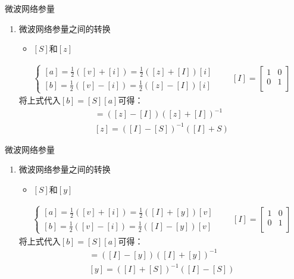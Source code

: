 \begin{frame}{微波网络参量}
    \begin{enumerate}
        \resume
        \item 微波网络参量之间的转换
        \begin{itemize}
            \item $[S]$和$[z]$
        \end{itemize}
        \begin{align*}
            \begin{cases}
                [a]=\frac{1}{2}([v]+[i])=\frac{1}{2}([z]+[I])[i]\\
                [b]=\frac{1}{2}([v]-[i])=\frac{1}{2}([z]-[I])[i]
            \end{cases}
            \qquad
            [I]=\begin{bmatrix*}
                1 & 0 \\
                0 & 1 \\
            \end{bmatrix*}
        \end{align*}
        将上式代入$[b]=[S][a]$可得：
        \begin{gather*}
            [S]=([z]-[I])([z]+[I])^{-1}\\
            [z]=([I]-[S])^{-1}([I]+{S})
        \end{gather*}
    \end{enumerate}
\end{frame}

\begin{frame}{微波网络参量}
    \begin{enumerate}
        \resume
        \item 微波网络参量之间的转换
        \begin{itemize}
            \item $[S]$和$[y]$
        \end{itemize}
        \begin{align*}
            \begin{cases}
                [a]=\frac{1}{2}([v]+[i])=\frac{1}{2}([I]+[y])[v]\\
                [b]=\frac{1}{2}([v]-[i])=\frac{1}{2}([I]-[y])[v]
            \end{cases}
            \qquad
            [I]=\begin{bmatrix*}
                1 & 0 \\
                0 & 1 \\
            \end{bmatrix*}
        \end{align*}
        将上式代入$[b]=[S][a]$可得：
        \begin{gather*}
            [S]=([I]-[y])([I]+[y])^{-1}\\
            [y]=([I]+[S])^{-1}([I]-[S])
        \end{gather*}
    \end{enumerate}
\end{frame}

